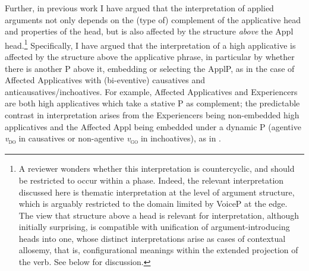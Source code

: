 \documentclass[output=paper,colorlinks,citecolor=brown,nonflat]{./langscibook}
\begin{document}
Further, in previous work I have argued that the interpretation of applied arguments not only depends on the (type of) complement of the applicative head and properties of the head, but is also affected by the structure \textit{above} the Appl head.\footnote{A reviewer wonders whether this interpretation is countercyclic, and should be restricted to occur within a phase. Indeed, the relevant interpretation discussed here is thematic interpretation at the level of argument structure, which is arguably restricted to the domain limited by VoiceP at the edge. The view that structure above a head is relevant for interpretation, although initially surprising, is compatible with  unification of argument-introducing heads into one, whose distinct interpretations arise as cases of contextual allosemy, that is, configurational meanings within the extended projection of the verb. See below for discussion.} Specifically, I have argued that the interpretation of a high applicative is affected by the structure above the applicative phrase, in particular by whether there is another \liv P above it, embedding or selecting the ApplP, as in the case of Affected Applicatives with (bi-eventive) causatives and anticausatives/inchoatives. For example, Affected Applicatives  and Experiencers  are both high applicatives which take a stative \liv P as complement; the predictable contrast in interpretation arises from the Experiencers being non-embedded high applicatives  and the Affected Appl being embedded under a dynamic \liv P (agentive \textit{v}\textsc{\textsubscript{do}} in causatives or non-agentive \textit{v}\textsc{\textsubscript{go}} in inchoatives), as in .
\end{document}
